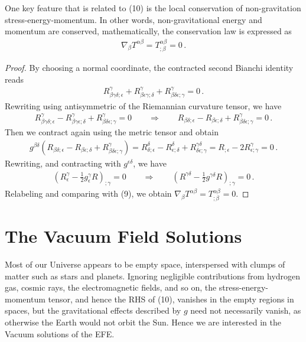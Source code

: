 \documentclass[11pt, onesided]{book}
\theoremstyle{break}
\theoremstyle{break}
\begin{document}
One key feature that is related to (10) is the local conservation of non-gravitation stress-energy-momentum. In other words, non-gravitational energy and momentum are conserved, mathematically, the conservation law is expressed as
\begin{align*}
\nabla_\beta T^{\alpha\beta} = T^{\alpha\beta}_{; \beta} = 0\,.
\end{align*}
\begin{proof}
By choosing a normal coordinate, the contracted second Bianchi identity reads
\begin{align*}
R_{\beta\gamma\delta;\epsilon}^{\gamma}+ R_{\beta\epsilon\gamma;\delta}^{\gamma}+R_{\beta\delta \epsilon;\gamma}^\gamma = 0\,.
\end{align*}
Rewriting using antisymmetric of the Riemannian curvature tensor, we have
\begin{align*}
R_{\beta\gamma\delta;\epsilon}^{\gamma} - R_{\beta\gamma\epsilon;\delta}^\gamma + R_{\beta\delta\epsilon;\gamma}^\gamma = 0\qquad \Rightarrow \qquad R_{\beta\delta;\epsilon}-R_{\beta\epsilon;\delta} + R_{\beta	\delta\epsilon;\gamma}^\gamma = 0\,.
\end{align*}
Then we contract again using the metric tensor and obtain
\begin{align*}
g^{\beta\delta}(R_{\beta\delta;\epsilon}-R_{\beta\epsilon;\delta}+R_{\beta\delta\epsilon;\gamma}^\gamma) = R_{\delta;\epsilon}^\delta - R_{\epsilon;\delta}^\delta + R_{\delta\epsilon;\gamma}^{\gamma\delta} =R_{;\epsilon} - 2R_{\epsilon;\gamma}^\gamma = 0\,.
\end{align*}
Rewriting, and contracting with $g^{\epsilon\delta}$, we have
\begin{align*}
\left(R_\epsilon^\gamma - \frac{1}{2}g_{\epsilon}^\gamma R\right)_{;\gamma} = 0 \qquad \Rightarrow \qquad \left(R^{\gamma\delta} - \frac{1}{2}g^{\gamma\delta}R\right)_{;\gamma} = 0\,.
\end{align*}
Relabeling and comparing with (9), we obtain $\nabla_\beta T^{\alpha\beta} = T^{\alpha\beta}_{;\beta} =0$.
\end{proof}

\newpage
\section[The Vacuum Field Solutions]{\color{red}The Vacuum Field Solutions\color{red}}
Most of our Universe appears to be empty space, interspersed with clumps of matter such as stars and planets. Ignoring negligible contributions from hydrogen gas, cosmic rays, the electromagnetic fields, and so on, the stress-energy-momentum tensor, and hence the RHS of (10), vanishes in the empty regions in spaces, but the gravitational effects described by $g$ need not necessarily vanish, as otherwise the Earth would not orbit the Sun. Hence we are interested in the Vacuum solutions of the EFE.\\
\end{document}

